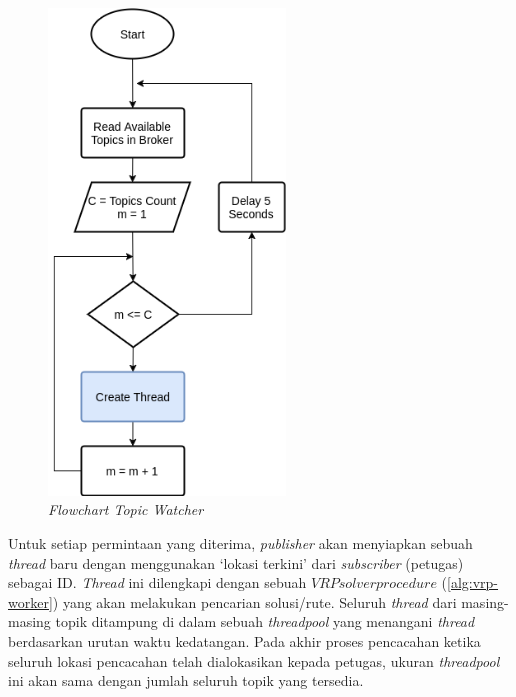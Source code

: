\begin{figure}[!]
	\centering
	\includegraphics[width=6.3cm]{Resources/Images/topic-watcher}
	\caption{\textit{\textit{Flowchart} Topic Watcher}}
	\label{fig:topic-watcher}
\end{figure}


Untuk setiap permintaan yang diterima, \textit{publisher} akan menyiapkan sebuah \textit{thread} baru dengan menggunakan `lokasi terkini' dari \textit{subscriber} (petugas) sebagai ID. \textit{Thread} ini dilengkapi dengan sebuah $VRP solver procedure$ (\autoref{alg:vrp-worker}) yang akan melakukan pencarian solusi/rute. Seluruh \textit{thread} dari masing-masing topik ditampung di dalam sebuah \textit{threadpool} yang menangani \textit{thread} berdasarkan urutan waktu kedatangan. Pada akhir proses pencacahan ketika seluruh lokasi pencacahan telah dialokasikan kepada petugas, ukuran \textit{threadpool} ini akan sama dengan jumlah seluruh topik yang tersedia. 


